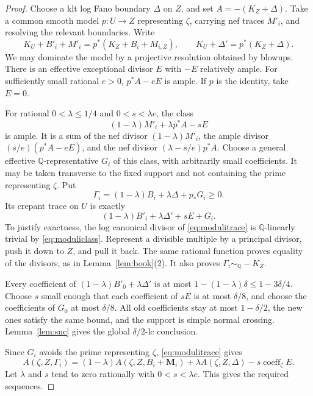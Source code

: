 \documentclass[11pt,reqno]{amsart}
\numberwithin{equation}{section}
\theoremstyle{definition}
\theoremstyle{remark}
\newcommand{\Q}{\mathbb Q}
\newcommand{\simq}{\sim_{\Q}}
\newcommand{\coef}{\operatorname{coeff}}
\newcommand{\bM}{\mathbf M}
\begin{document}
\begin{proof}
Choose a klt log Fano boundary $\Delta$ on $Z$, and set $A=-(K_Z+\Delta)$. Take a common smooth model $p:U\to Z$ representing $\zeta$, carrying nef traces $M'_i$, and resolving the relevant boundaries. Write
\[
 K_U+B'_i+M'_i=p^*(K_Z+B_i+M_{i,Z}),\qquad
 K_U+\Delta'=p^*(K_Z+\Delta).
\]
We may dominate the model by a projective resolution obtained by blowups. There is an effective exceptional divisor $E$ with $-E$ relatively ample. For sufficiently small rational $e>0$, $p^*A-eE$ is ample. If $p$ is the identity, take $E=0$.

For rational $0<\lambda\le1/4$ and $0<s<\lambda e$, the class
\begin{equation}\label{eq:moduliclass}
 (1-\lambda)M'_i+\lambda p^*A-sE
\end{equation}
is ample. It is a sum of the nef divisor $(1-\lambda)M'_i$, the ample divisor $(s/e)(p^*A-eE)$, and the nef divisor $(\lambda-s/e)p^*A$. Choose a general effective $\Q$-representative $G_i$ of this class, with arbitrarily small coefficients. It may be taken transverse to the fixed support and not containing the prime representing $\zeta$. Put
\[
 \Gamma_i=(1-\lambda)B_i+\lambda\Delta+p_*G_i\ge0.
\]
Its crepant trace on $U$ is exactly
\begin{equation}\label{eq:modulitrace}
 (1-\lambda)B'_i+\lambda\Delta'+sE+G_i.
\end{equation}
To justify exactness, the log canonical divisor of \eqref{eq:modulitrace} is $\Q$-linearly trivial by \eqref{eq:moduliclass}. Represent a divisible multiple by a principal divisor, push it down to $Z$, and pull it back. The same rational function proves equality of the divisors, as in Lemma~\ref{lem:book}(2). It also proves $\Gamma_i\simq-K_Z$.

Every coefficient of $(1-\lambda)B'_0+\lambda\Delta'$ is at most $1-(1-\lambda)\delta\le1-3\delta/4$. Choose $s$ small enough that each coefficient of $sE$ is at most $\delta/8$, and choose the coefficients of $G_0$ at most $\delta/8$. All old coefficients stay at most $1-\delta/2$, the new ones satisfy the same bound, and the support is simple normal crossing. Lemma~\ref{lem:snc} gives the global $\delta/2$-lc conclusion.

Since $G_i$ avoids the prime representing $\zeta$, \eqref{eq:modulitrace} gives
\[
 A(\zeta,Z,\Gamma_i)
 =(1-\lambda)A(\zeta,Z,B_i+\bM_i)
 +\lambda A(\zeta,Z,\Delta)-s\coef_\zeta E.
\]
Let $\lambda$ and $s$ tend to zero rationally with $0<s<\lambda e$. This gives the required sequences.
\end{proof}
\end{document}
